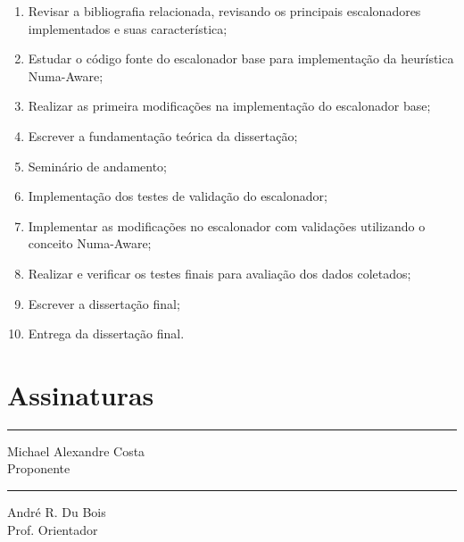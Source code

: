 \documentclass[diss-proposta,nocipinfo]{texufpel}
\begin{document}
\begin{enumerate}
  \item Revisar a bibliografia relacionada, revisando os principais escalonadores implementados e suas característica;
  \item Estudar o código fonte do escalonador base para implementação da heurística Numa-Aware;
  \item Realizar as primeira modificações na implementação do escalonador base;
  \item Escrever a fundamentação teórica da dissertação;
  \item Seminário de andamento;
  \item Implementação dos testes de validação do escalonador;
  \item Implementar as modificações no escalonador com validações utilizando o conceito Numa-Aware;
  \item Realizar e verificar os testes finais para avaliação dos dados coletados;
  \item Escrever a dissertação final;
  \item Entrega da dissertação final.
\end{enumerate}






\chapter{Assinaturas}
\vspace{2cm}

\begin{center}
\rule{8cm}{.3mm}
\medskip

	Michael Alexandre Costa\\
	Proponente

\end{center}

\vspace{4cm}

\begin{center}
\rule{8cm}{.3mm}
\medskip

	André R. Du Bois\\
	Prof. Orientador

\end{center}
\end{document}

